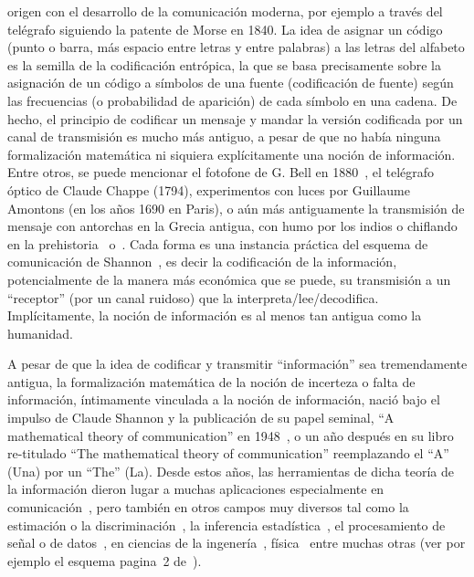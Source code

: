 \label{Sec:SZ:Introduccion}

origen con  el desarrollo de la  comunicaci\'on moderna, por  ejemplo a trav\'es
del tel\'egrafo  siguiendo la patente  de Morse en  1840. La idea de  asignar un
c\'odigo (punto  o barra,  m\'as espacio  entre letras y  entre palabras)  a las
letras del  alfabeto es la semilla  de la codificaci\'on entr\'opica,  la que se
basa  precisamente sobre  la asignaci\'on  de un  c\'odigo a  s\'imbolos  de una
fuente  (codificaci\'on de fuente)  seg\'un las  frecuencias (o  probabilidad de
aparici\'on)  de  cada s\'imbolo  en  una cadena.   De  hecho,  el principio  de
codificar  un  mensaje  y  mandar  la  versi\'on  codificada  por  un  canal  de
transmisi\'on  es  mucho  m\'as antiguo,  a  pesar  de  que no  hab\'ia  ninguna
formalizaci\'on  matem\'atica  ni  siquiera  expl\'icitamente  una  noci\'on  de
informaci\'on.   Entre otros,  se  puede mencionar  el  fotofone de  G. Bell  en
1880~\cite{Bel1880,  Bru90}, el  tel\'egrafo \'optico  de Claude  Chappe (1794),
experimentos con luces  por Guillaume Amontons (en los a\~nos  1690 en Paris), o
a\'un m\'as antiguamente la transmisi\'on  de mensaje con antorchas en la Grecia
antigua,  con humo  por los  indios o  chiflando en  la prehistoria~\cite{Mon08}
o~\cite[Cap.~3]{Arn01}.  Cada  forma es una instancia pr\'actica  del esquema de
comunicaci\'on de Shannon~\cite{Sha48, ShaWea64},  es decir la codificaci\'on de
la informaci\'on, potencialmente de la manera m\'as econ\'omica que se puede, su
transmisi\'on   a   un   ``receptor''    (por   un   canal   ruidoso)   que   la
interpreta/lee/decodifica.  Impl\'icitamente, la noci\'on de informaci\'on es al
menos tan antigua como la humanidad.

A  pesar  de  que  la  idea  de codificar  y  transmitir  ``informaci\'on''  sea
tremendamente  antigua,  la  formalizaci\'on  matem\'atica  de  la  noci\'on  de
incerteza o  falta de  informaci\'on, \'intimamente vinculada  a la  noci\'on de
informaci\'on, naci\'o bajo  el impulso de Claude Shannon  y la publicaci\'on de
su   papel   seminal,   ``A    mathematical   theory   of   communication''   en
1948~\cite{Sha48},  o   un  a\~no  despu\'es  en  su   libro  re-titulado  ``The
mathematical  theory  of communication''  reemplazando  el  ``A''  (Una) por  un
``The''  (La). Desde  estos a\~nos,  las herramientas  de dicha  teor\'ia  de la
informaci\'on   dieron   lugar    a   muchas   aplicaciones   especialmente   en
comunicaci\'on~\cite[y  ref.]{CovTho06, Ver98, Gal01},  pero tambi\'en  en otros
campos  muy diversos  tal  como la  estimaci\'on  o la  discriminaci\'on~\cite[y
ref.]{CovTho06,      Kay93,       Bos07,      LehCas98},      la      inferencia
estad\'istica~\cite{Rob07,   Par06},   el   procesamiento   de  se\~nal   o   de
datos~\cite[y   Ref.]{PhiRou92,   EbeMol00,    Bas13},   en   ciencias   de   la
ingener\'ia~\cite{Arn01,    Kap89,    KapKes92,   PhiRou92},    f\'isica~\cite[y
Ref.]{Arn01, OhyPet93,  Mer18} entre  muchas otras (ver  por ejemplo  el esquema
pagina~2 de~\cite{CovTho06}).

